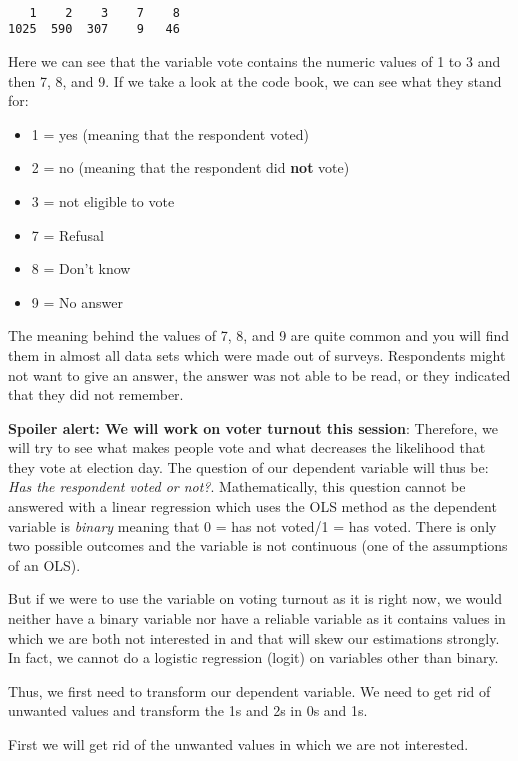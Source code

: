 \documentclass[
  letterpaper,
  DIV=11,
  numbers=noendperiod]{scrreprt}
\providecommand{\tightlist}{%
  \setlength{\itemsep}{0pt}\setlength{\parskip}{0pt}}\usepackage{longtable,booktabs,array}
\begin{document}
\begin{verbatim}

   1    2    3    7    8 
1025  590  307    9   46 
\end{verbatim}

Here we can see that the variable vote contains the numeric values of 1
to 3 and then 7, 8, and 9. If we take a look at the code book, we can
see what they stand for:

\begin{itemize}
\tightlist
\item
  1 = yes (meaning that the respondent voted)
\item
  2 = no (meaning that the respondent did \textbf{not} vote)
\item
  3 = not eligible to vote
\item
  7 = Refusal
\item
  8 = Don't know
\item
  9 = No answer
\end{itemize}

The meaning behind the values of 7, 8, and 9 are quite common and you
will find them in almost all data sets which were made out of surveys.
Respondents might not want to give an answer, the answer was not able to
be read, or they indicated that they did not remember.

\textbf{Spoiler alert: We will work on voter turnout this session}:
Therefore, we will try to see what makes people vote and what decreases
the likelihood that they vote at election day. The question of our
dependent variable will thus be: \emph{Has the respondent voted or
not?}. Mathematically, this question cannot be answered with a linear
regression which uses the OLS method as the dependent variable is
\emph{binary} meaning that 0 = has not voted/1 = has voted. There is
only two possible outcomes and the variable is not continuous (one of
the assumptions of an OLS).

But if we were to use the variable on voting turnout as it is right now,
we would neither have a binary variable nor have a reliable variable as
it contains values in which we are both not interested in and that will
skew our estimations strongly. In fact, we cannot do a logistic
regression (logit) on variables other than binary.

Thus, we first need to transform our dependent variable. We need to get
rid of unwanted values and transform the 1s and 2s in 0s and 1s.

First we will get rid of the unwanted values in which we are not
interested.
\end{document}
